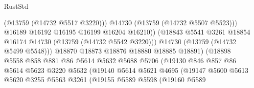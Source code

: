 \begin{lexlean}{RustStd}
\begin{coremodule}
                                            (@13759 (@14732 @5517 @3220)))
                                          @14730
                                          (@13759 (@14732 @5507 @5523)))
                                        @16189
                                        @16192
                                        @16195
                                        @16199
                                        @16204
                                        @16210))
                                    (@18843
                                      @5541
                                      @3261
                                      @18854
                                      @16174
                                      @14730
                                      (@13759 (@14732 @5542 @3220)))
                                    @14730
                                    (@13759 (@14732 @5499 @5548)))
                                  @18870
                                  @18873
                                  @18876
                                  @18880
                                  @18885
                                  @18891)
                                (@18898
                                  @5558
                                  @858
                                  @881
                                  @86
                                  @5614
                                  @5632
                                  @5688
                                  @5706
                                  (@19130
                                    @846
                                    @857
                                    @86
                                    @5614
                                    @5623
                                    @3220
                                    @5632
                                    (@19140
                                      @5614
                                      @5621
                                      @4695
                                      (@19147
                                        @5600
                                        @5613
                                        @5620
                                        @3255
                                        @5563
                                        @3261
                                        (@19155
                                          @5589
                                          @5598
                                          (@19160
                                            @5589

\end{coremodule}
\end{lexlean}
